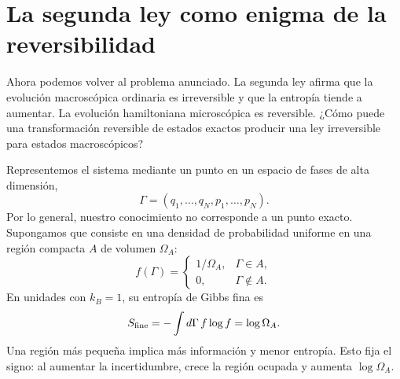 \begin{classroomqa}\end{classroomqa}

\section{La segunda ley como enigma de la reversibilidad}

Ahora podemos volver al problema anunciado. La segunda ley afirma que la evolución macroscópica ordinaria es irreversible y que la entropía tiende a aumentar. La evolución hamiltoniana microscópica es reversible. ¿Cómo puede una transformación reversible de estados exactos producir una ley irreversible para estados macroscópicos?

Representemos el sistema mediante un punto en un espacio de fases de alta dimensión, \[
 \Gamma=(q_1,\ldots,q_N,p_1,\ldots,p_N).
\]Por lo general, nuestro conocimiento no corresponde a un punto exacto. Supongamos que consiste en una densidad de probabilidad uniforme en una región compacta \(A\) de volumen \(\Omega_A\): \begin{equation}
 f(\Gamma)=
 \begin{cases}
  1/\Omega_A,&\Gamma\in A,\\
  0,&\Gamma\notin A.
 \end{cases}
 \label{eq:sm7-uniform-blob}
\end{equation}En unidades con \(k_B=1\), su entropía de Gibbs fina es \begin{equation}
 S_{\rm fine}
 =-\int d\Gamma\,f\log f
 =\log\Omega_A.
 \label{eq:sm7-blob-entropy}
\end{equation}Una región más pequeña implica más información y menor entropía. Esto fija el signo: al aumentar la incertidumbre, crece la región ocupada y aumenta \(\log\Omega_A\).

